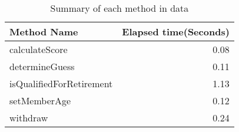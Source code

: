 \begin{table}[ht]
\centering
\begin{tabular}{lr}
  \hline
Method Name & Elapsed time(Seconds) \\ 
  \hline
calculateScore & 0.08 \\ 
  determineGuess & 0.11 \\ 
  isQualifiedForRetirement & 1.13 \\ 
  setMemberAge & 0.12 \\ 
  withdraw & 0.24 \\ 
   \hline
\end{tabular}
\caption{Summary of each method in data} 
\label{table:each_method_summary 6}
\end{table}
